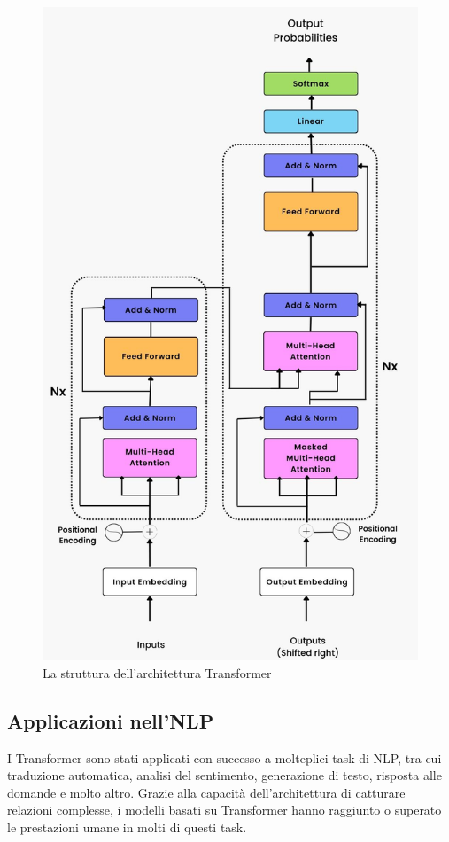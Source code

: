 \begin{center}
    \begin{figure}[H]
        \centering
        \includegraphics[width=0.5\pdfpagewidth]{images/Transformer.png}
        \caption{La struttura dell'architettura Transformer}
        \label{fig:transformer}
    \end{figure}
    
\end{center}

\subsection{Applicazioni nell'NLP}
I Transformer sono stati applicati con successo a molteplici task di NLP, tra cui traduzione automatica, analisi del sentimento, generazione di testo, risposta alle domande e molto altro. Grazie alla capacità dell'architettura di catturare relazioni complesse, i modelli basati su Transformer hanno raggiunto o superato le prestazioni umane in molti di questi task.

